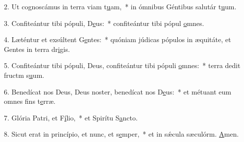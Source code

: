 2. Ut cognoscámus in terra viam t\uline{u}am,~* in ómnibus Géntibus salutár t\uline{u}um.\par 
3. Confiteántur tibi pópuli, D\uline{e}us:~* confiteántur tibi pópul \uline{o}mnes.\par 
4. Læténtur et exsúltent G\uline{e}ntes:~* quóniam júdicas pópulos in æquitáte, et Gentes in terra dr\uline{i}gis.\par 
5. Confiteántur tibi pópuli, Deus, confiteántur tibi pópuli \uline{o}mnes:~* terra dedit fructm s\uline{u}um.\par 
6. Benedícat nos Deus, Deus noster, benedícat nos D\uline{e}us:~* et métuant eum omnes fins t\uline{e}rræ.\par 
7. Glória Patri, et F\uline{í}lio,~* et Spirítu S\uline{a}ncto.\par 
8. Sicut erat in princípio, et nunc, et s\uline{e}mper,~* et in sǽcula sæculórm. \uline{A}men.\par 
